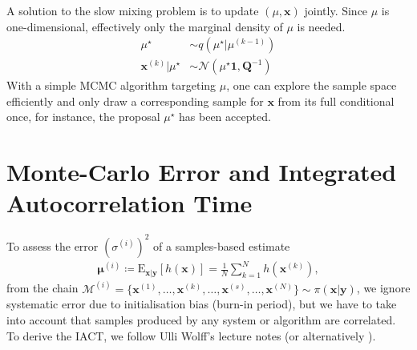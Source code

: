 A solution to the slow mixing problem is to update $(\mu, \bm{x})$ jointly.
Since $\mu$ is one-dimensional, effectively only the marginal density of $\mu$ is needed.
\begin{align}
	\mu^{\star}  &\sim q (\mu^{\star}|	\mu^{(k-1)} ) \\
	\bm{x}^{(k)} | \mu^{\star} &\sim \mathcal{N} (	\mu^{\star}\bm{1}, \bm{Q}^{-1}) 
\end{align}
With a simple MCMC algorithm targeting $ \mu$, one can explore the sample space efficiently and only draw a corresponding sample for $\bm{x}$ from its full conditional once, for instance, the proposal $\mu^{\star}$ has been accepted.

\section{Monte-Carlo Error and Integrated Autocorrelation Time}
\label{ap:IATC}
To assess the error $(\sigma^{(i)})^2$ of a samples-based estimate 
\begin{align}
	\bm{\mu}^{(i)} \coloneqq	\text{E}_{\bm{x}|\bm{y}} [h(\bm{x})] = \frac{1}{N} \sum_{k=1}^{N} h(\bm{x}^{(k)}),
\end{align} 
from the chain $\mathcal{M}^{(i)} = \{\bm{x}^{(1)}, \dots,\bm{x}^{(k)},\dots, \bm{x}^{(s)},\dots, \bm{x}^{(N)}\} \sim \pi(\bm{x}|\bm{y})$, we ignore systematic error due to initialisation bias (burn-in period), but we have to take into account that samples produced by any system or algorithm are correlated.
To derive the IACT, we follow Ulli Wolff's lecture notes \cite{wolff2002LecNot} (or alternatively \cite{wolff2004monte}).

